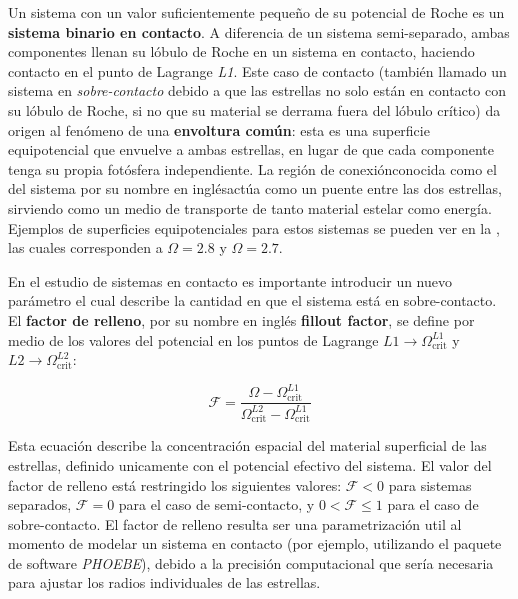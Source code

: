 Un sistema con un valor suficientemente pequeño de su potencial de Roche es un
\textbf{sistema binario en contacto}. A diferencia de un sistema semi-separado,
ambas componentes llenan su lóbulo de Roche en un sistema en contacto, haciendo
contacto en el punto de Lagrange \textit{L1}. Este caso de contacto (también
llamado un sistema en \textit{sobre-contacto} debido a que las estrellas no solo
están en contacto con su lóbulo de Roche, si no que su material se derrama fuera
del lóbulo crítico) da origen al fenómeno de una \textbf{envoltura común}: esta
es una superficie equipotencial que envuelve a ambas estrellas, en lugar de que
cada componente tenga su propia fotósfera independiente. La región de
conexión\textemdash conocida como el  del sistema por su nombre
en inglés\textemdash actúa como un puente entre las dos estrellas, sirviendo
como un medio de transporte de tanto material estelar como energía. Ejemplos de
superficies equipotenciales para estos sistemas se pueden ver en la
, las cuales corresponden a $\Omega = 2.8$ y
$\Omega = 2.7$.

En el estudio de sistemas en contacto es importante introducir un nuevo
parámetro el cual describe la cantidad en que el sistema está en sobre-contacto.
El \textbf{factor de relleno}, por su nombre en inglés \textbf{fillout factor},
se define por medio de los valores del potencial en los puntos de Lagrange $L1
\rightarrow \Omega^{L1}_{\mathrm{crit}}$ y $L2 \rightarrow
\Omega^{L2}_{\mathrm{crit}}$:

\begin{eqfloat}
	\centering
	\begin{equation}
		\mathcal{F} = \frac{\Omega - \Omega^{L1}_{\textrm{crit}}}{\Omega^{L2}_{\textrm{crit}} - \Omega^{L1}_{\textrm{crit}}}
	\end{equation}
\end{eqfloat}

Esta ecuación describe la concentración espacial del material superficial de las
estrellas, definido unicamente con el potencial efectivo del sistema. El valor
del factor de relleno está restringido los siguientes valores: $\mathcal{F} < 0$
para sistemas separados, $\mathcal{F} = 0$ para el caso de semi-contacto, y $0 <
\mathcal{F} \leq 1$ para el caso de sobre-contacto. El factor de relleno resulta
ser una parametrización util al momento de modelar un sistema en contacto (por
ejemplo, utilizando el paquete de software \textit{PHOEBE}), debido a la
precisión computacional que sería necesaria para ajustar los radios individuales
de las estrellas. 

